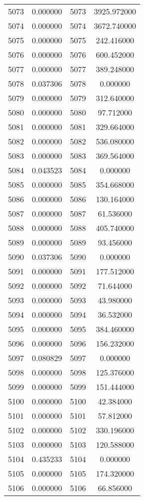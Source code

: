\documentclass[12pt]{article}
\begin{document}
\begin{longtable}{@{}cccc@{}}
5073 & 0.000000 & 5073 & 3925.972000 \\
5074 & 0.000000 & 5074 & 3672.740000 \\
5075 & 0.000000 & 5075 & 242.416000 \\
5076 & 0.000000 & 5076 & 600.452000 \\
5077 & 0.000000 & 5077 & 389.248000 \\
5078 & 0.037306 & 5078 & 0.000000 \\
5079 & 0.000000 & 5079 & 312.640000 \\
5080 & 0.000000 & 5080 & 97.712000 \\
5081 & 0.000000 & 5081 & 329.664000 \\
5082 & 0.000000 & 5082 & 536.080000 \\
5083 & 0.000000 & 5083 & 369.564000 \\
5084 & 0.043523 & 5084 & 0.000000 \\
5085 & 0.000000 & 5085 & 354.668000 \\
5086 & 0.000000 & 5086 & 130.164000 \\
5087 & 0.000000 & 5087 & 61.536000 \\
5088 & 0.000000 & 5088 & 405.740000 \\
5089 & 0.000000 & 5089 & 93.456000 \\
5090 & 0.037306 & 5090 & 0.000000 \\
5091 & 0.000000 & 5091 & 177.512000 \\
5092 & 0.000000 & 5092 & 71.644000 \\
5093 & 0.000000 & 5093 & 43.980000 \\
5094 & 0.000000 & 5094 & 36.532000 \\
5095 & 0.000000 & 5095 & 384.460000 \\
5096 & 0.000000 & 5096 & 156.232000 \\
5097 & 0.080829 & 5097 & 0.000000 \\
5098 & 0.000000 & 5098 & 125.376000 \\
5099 & 0.000000 & 5099 & 151.444000 \\
5100 & 0.000000 & 5100 & 42.384000 \\
5101 & 0.000000 & 5101 & 57.812000 \\
5102 & 0.000000 & 5102 & 330.196000 \\
5103 & 0.000000 & 5103 & 120.588000 \\
5104 & 0.435233 & 5104 & 0.000000 \\
5105 & 0.000000 & 5105 & 174.320000 \\
5106 & 0.000000 & 5106 & 66.856000 \\

\end{longtable}
\end{document}
